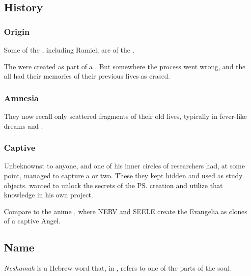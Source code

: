 \subsection{History}





\subsubsection{Origin}
Some of the \Malachim, including Ramiel, are of the \satharioth. 

The \malachim{} were created as part of a .
But somewhere the process went wrong, and the \Malachim{} all had their memories of their previous lives as \resphain{} erased. 





\subsubsection{Amnesia}
They now recall only scattered fragments of their old lives, typically in fever-like dreams and \deajvus. 





\subsubsection{Captive \malach}
Unbeknownst to anyone, \Azraid{} and one of his inner circles of researchers had, at some point, managed to capture a \malach{} or two. 
These they kept hidden and used as study objects. 
\Azraid{} wanted to unlock the secrets of the \ps{\malachim} creation and utilize that knowledge in his own  project. 

Compare to the anime \cite{Anime:NeonGenesisEvangelion}, where NERV and SEELE create the Evangelia as clones of a captive Angel. 









\subsection{Name}
\emph{Neshamah} is a Hebrew word that, in \Cabbalah, refers to one of the  parts of the \human soul.









